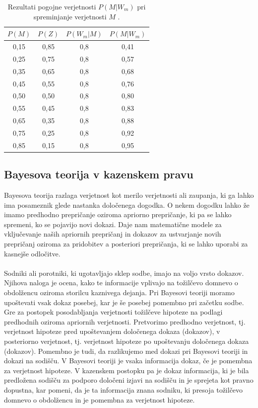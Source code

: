 \documentclass[12pt,a4paper]{amsart}
\theoremstyle{definition} %
\theoremstyle{plain} %
\begin{document}
\begin{table}[h!]
    \centering
    \caption{Rezultati pogojne verjetnosti $P(M \lvert W_m)$ pri spreminjanje verjetnosti $M$ .}
    \begin{tabular}{c c c c}
        \hline
        $P(M)$ & $P(Z)$ & $P(W_m \lvert M)$ & $P(M \lvert W_m)$ \\
        \hline
        0,15 & 0,85 & 0,8 & 0,41 \\
        0,25 & 0,75 & 0,8 & 0,57 \\
        0,35 & 0,65 & 0,8 & 0,68 \\
        0,45 & 0,55 & 0,8 & 0,76 \\
        0,50 & 0,50 & 0,8 & 0,80 \\
        0,55 & 0,45 & 0,8 & 0,83 \\
        0,65 & 0,35 & 0,8 & 0,88 \\
        0,75 & 0,25 & 0,8 & 0,92 \\
        0,85 & 0,15 & 0,8 & 0,95 \\
        \hline
    \end{tabular} \vspace{2mm}
\end{table}

\subsection{Bayesova teorija v kazenskem pravu}
Bayesova teorija razlaga verjetnost kot merilo verjetnosti ali zaupanja, ki ga lahko ima posameznik glede nastanka določenega dogodka.
O nekem dogodku lahko že imamo predhodno prepričanje oziroma apriorno prepričanje, ki pa se lahko spremeni, ko se pojavijo novi dokazi. Daje nam
matematične modele za vključevanje naših apriornih prepričanj in dokazov za ustvarjanje novih prepričanj oziroma za pridobitev a posteriori
prepričanja, ki se lahko uporabi za kasnejše odločitve.\\\\
Sodniki ali porotniki, ki ugotavljajo sklep sodbe, imajo na voljo vrsto dokazov. Njihova naloga je ocena, kako te informacije vplivajo na tožilčevo
domnevo o obdolžencu oziroma storilcu kaznivega dejanja. Pri Bayesovi teoriji moramo upoštevati vsak dokaz posebej, kar je še posebej pomembno pri
začetku sodbe. Gre za postopek posodabljanja verjetnosti tožilčeve hipoteze na podlagi predhodnih oziroma apriornih verjetnosti. Pretvorimo predhodno
verjetnost, tj. verjetnost hipoteze pred upoštevanjem določenega dokaza (dokazov), v posteriorno verjetnost, tj. verjetnost hipoteze po upoštevanju
določenega dokaza (dokazov). Pomembno je tudi, da razlikujemo med dokazi pri Bayesovi teoriji in dokazi na sodišču. V Bayesovi teoriji je vsaka informacija
dokaz, če je pomembna za verjetnost hipoteze. V kazenskem postopku pa je dokaz informacija, ki je bila predložena sodišču za podporo določeni
izjavi na sodišču in je sprejeta kot pravno dopustna, kar pomeni, da je ta informacija znana sodniku, ki presoja tožilčevo domnevo o obdolžencu in je
pomembna za verjetnost hipoteze.
\end{document}
